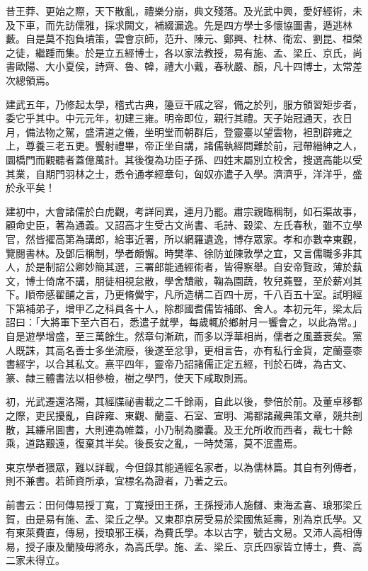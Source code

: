 
\begin{pinyinscope}
昔王莽、更始之際，天下散亂，禮樂分崩，典文殘落。及光武中興，愛好經術，未及下車，而先訪儒雅，採求闕文，補綴漏逸。先是四方學士多懷協圖書，遁逃林藪。自是莫不抱負墳策，雲會京師，范升、陳元、鄭興、杜林、衛宏、劉昆、桓榮之徒，繼踵而集。於是立五經博士，各以家法教授，易有施、孟、梁丘、京氏，尚書歐陽、大小夏侯，詩齊、魯、韓，禮大小戴，春秋嚴、顏，凡十四博士，太常差次總領焉。

建武五年，乃修起太學，稽式古典，籩豆干戚之容，備之於列，服方領習矩步者，委它乎其中。中元元年，初建三雍。明帝即位，親行其禮。天子始冠通天，衣日月，備法物之駕，盛清道之儀，坐明堂而朝群后，登靈臺以望雲物，袒割辟雍之上，尊養三老五更。饗射禮畢，帝正坐自講，諸儒執經問難於前，冠帶縉紳之人，圜橋門而觀聽者蓋億萬計。其後復為功臣子孫、四姓末屬別立校舍，搜選高能以受其業，自期門羽林之士，悉令通孝經章句，匈奴亦遣子入學。濟濟乎，洋洋乎，盛於永平矣！

建初中，大會諸儒於白虎觀，考詳同異，連月乃罷。肅宗親臨稱制，如石渠故事，顧命史臣，著為通義。又詔高才生受古文尚書、毛詩、穀梁、左氏春秋，雖不立學官，然皆擢高第為講郎，給事近署，所以網羅遺逸，博存眾家。孝和亦數幸東觀，覽閱書林。及鄧后稱制，學者頗懈。時樊準、徐防並陳敦學之宜，又言儒職多非其人，於是制詔公卿妙簡其選，三署郎能通經術者，皆得察舉。自安帝覽政，薄於蓺文，博士倚席不講，朋徒相視怠散，學舍穨敝，鞠為園蔬，牧兒蕘豎，至於薪刈其下。順帝感翟酺之言，乃更脩黌宇，凡所造構二百四十房，千八百五十室。試明經下第補弟子，增甲乙之科員各十人，除郡國耆儒皆補郎、舍人。本初元年，梁太后詔曰：「大將軍下至六百石，悉遣子就學，每歲輒於鄉射月一饗會之，以此為常。」自是遊學增盛，至三萬餘生。然章句漸疏，而多以浮華相尚，儒者之風蓋衰矣。黨人既誅，其高名善士多坐流廢，後遂至忿爭，更相言告，亦有私行金貨，定蘭臺桼書經字，以合其私文。熹平四年，靈帝乃詔諸儒正定五經，刊於石碑，為古文、篆、隸三體書法以相參檢，樹之學門，使天下咸取則焉。

初，光武遷還洛陽，其經牒祕書載之二千餘兩，自此以後，參倍於前。及董卓移都之際，吏民擾亂，自辟雍、東觀、蘭臺、石室、宣明、鴻都諸藏典策文章，競共剖散，其縑帛圖書，大則連為帷蓋，小乃制為縢囊。及王允所收而西者，裁七十餘乘，道路艱遠，復棄其半矣。後長安之亂，一時焚蕩，莫不泯盡焉。

東京學者猥眾，難以詳載，今但錄其能通經名家者，以為儒林篇。其自有列傳者，則不兼書。若師資所承，宜標名為證者，乃著之云。

前書云：田何傳易授丁寬，丁寬授田王孫，王孫授沛人施讎、東海孟喜、琅邪梁丘賀，由是易有施、孟、梁丘之學。又東郡京房受易於梁國焦延壽，別為京氏學。又有東萊費直，傳易，授琅邪王橫，為費氏學。本以古字，號古文易。又沛人高相傳易，授子康及蘭陵毋將永，為高氏學。施、孟、梁丘、京氏四家皆立博士，費、高二家未得立。


\end{pinyinscope}
